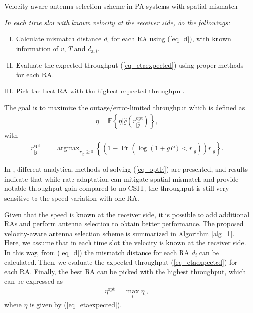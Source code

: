 \documentclass[conference]{IEEEtran}
\DeclareMathOperator*{\argmax}{argmax}
\begin{document}
\begin{algorithm}[tbp!]
 \caption{Velocity-aware antenna selection scheme in PA systems with spatial mismatch}
 \begin{algorithmic}
\STATE \textit{In each time slot with known velocity at the receiver side, do the followings:} 
\begin{enumerate}[I.]
\item Calculate mismatch distance $d_i$ for each \ac{RA} using (\ref{eq_d}), with known information of $v$, $T$ and $d_{\text{a},i}$.
\item Evaluate the expected throughput (\ref{eq_etaexpected}) using proper methods for each \ac{RA}.
\item Pick the best \ac{RA} with the highest expected throughput.
  \end{enumerate}
 \end{algorithmic}
 \label{alg_1}
 \end{algorithm}
 


The goal is to maximize the outage/error-limited throughput which is defined as 
\begin{align}\label{eq_etaexpected}
  \eta = \mathbb{E}\left\{\eta|{\hat {g}}(r_{|\hat{g}}^{\text{opt}})\right\},
\end{align}
with
\begin{align}\label{eq_optR}
    r_{|\hat{g}}^{\text{opt}}&=\argmax_{r_{|\hat{g}}\geq 0} \left\{ \left(1-\Pr\left(\log(1+gP)<r_{|\hat{g}}\right)\right)r_{|\hat{g}} \right\}.
    \end{align}

In \cite{Guo2019WCLrate,guo2020semilinear}, different analytical methods of solving (\ref{eq_optR}) are presented, and results indicate that while rate adaptation can mitigate spatial mismatch and provide notable throughput gain compared to no \ac{CSIT}, the throughput is still very sensitive to the speed variation with one \ac{RA}. 

Given that the speed is known at the receiver side, it is possible to add additional \acp{RA} and perform antenna selection to obtain better performance. The proposed velocity-aware antenna selection scheme is summarized in Algorithm \ref{alg_1}. Here, we assume that in each time slot the velocity is known at the receiver side. In this way, from (\ref{eq_d}) the mismatch distance for each \ac{RA} $d_i$ can be calculated. Then, we evaluate the expected throughput (\ref{eq_etaexpected}) for each \ac{RA}. Finally, the best \ac{RA} can be picked with the highest throughput, which can be expressed as
\begin{align}\label{eta_best}
    \eta^{\text{opt}} = \max_{i} \eta_i,
\end{align}
where $\eta$ is given by (\ref{eq_etaexpected}).
\end{document}
